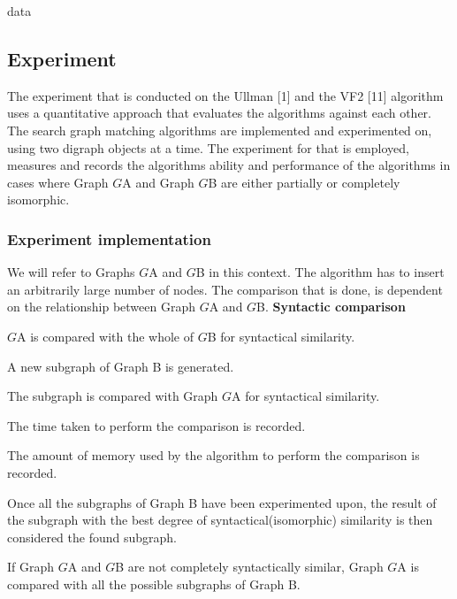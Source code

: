 \label{Experimentation}

{data}

\subsection{Experiment}
The experiment that is conducted on the Ullman [1] and the VF2 [11] algorithm uses a quantitative approach that evaluates the algorithms against each 
other. The search graph matching algorithms are implemented and experimented on, using two digraph objects at a time. The experiment for that is 
employed, measures and records the algorithms ability and performance of the algorithms in cases where Graph $G${\tiny A} and Graph $G${\tiny B} are 
either partially or completely isomorphic.
\subsubsection{Experiment implementation}

We will refer to Graphs $G${\tiny A} and $G${\tiny B} in this context.\newline\newline
The algorithm has to insert an arbitrarily large number of nodes.\newline\newline
The comparison that is done, is dependent on the relationship between Graph $G${\tiny A} and $G${\tiny B}.\newline\newline
\textbf{Syntactic comparison}					
\begin{myEnumerate}
\item $G${\tiny A} is compared with the whole of $G${\tiny B} for syntactical similarity.										
\begin{myEnumerate}
\item A new subgraph of Graph B is generated.
\item The subgraph is compared with Graph $G${\tiny A} for syntactical similarity.											
\begin{myEnumerate}
\item The time taken to perform the comparison is recorded.
\item The amount of memory used by the algorithm to perform the comparison is recorded.
\end{myEnumerate}	
\item Once all the subgraphs of Graph B have been experimented upon, the result of the subgraph with the best degree of syntactical(isomorphic) 
similarity is then considered the found subgraph.
\end{myEnumerate}
\item If Graph $G${\tiny A} and $G${\tiny B} are not completely syntactically similar, Graph $G${\tiny A} is compared with all the possible subgraphs of Graph B.
\end{myEnumerate}

